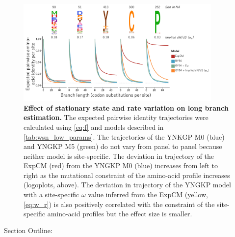 \documentclass[11pt]{article}
\newcommand\skhcomment[1]{{\color{cyan}#1}}
\begin{document}
\begin{figure}[H]
\centerline{\includegraphics[width=0.90\textwidth]{figures/decay.pdf}}
\caption{\label{fig:decay}
\textbf{Effect of stationary state and rate variation on long branch estimation.}
The expected pairwise identity trajectories were calculated using \ref{eq:f} and models described in \ref{tab:wsn_low_params}.
The trajectories of the YNKGP M0 (blue) and YNGKP M5 (green) do not vary from panel to panel because neither model is site-specific. 
The deviation in trajectory of the ExpCM (red) from the YNGKP M0 (blue) increases from left to right as the mutational constraint of the amino-acid profile increases (logoplots, above). 
The deviation in trajectory of the YNGKP model with a site-specific $\omega$ value inferred from the ExpCM (yellow, \ref{eq:w_r}) is also positively correlated with the constraint of the site-specific amino-acid profiles but the effect size is smaller. 
}
\end{figure}

\skhcomment{Section Outline:}
\end{document}
